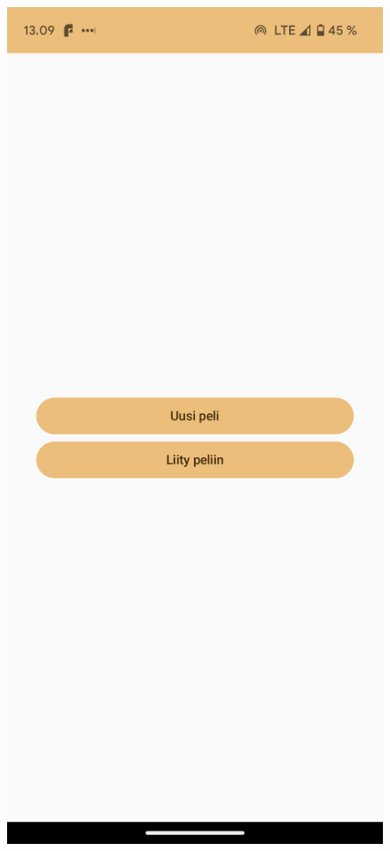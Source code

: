\begin{figure}[h!]
      \centering
      \begin{minipage}[t]{.3\textwidth}
            \includegraphics[width=\textwidth]{figures/screenshot-homescreen.png}

\end{minipage}
\end{figure}
